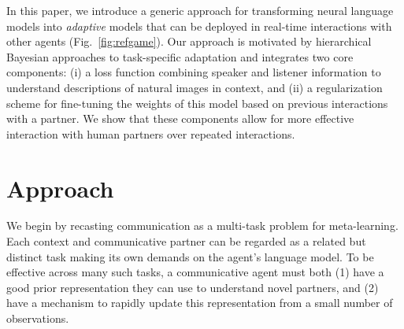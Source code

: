 In this paper, we introduce a generic approach for transforming neural language models into \emph{adaptive} models that can be deployed in real-time interactions with other agents (Fig.~\ref{fig:refgame}). 
Our approach is motivated by hierarchical Bayesian approaches to task-specific adaptation and integrates two core components: (i) a loss function combining speaker and listener information  
to understand descriptions of natural images in context, and (ii) a regularization scheme for fine-tuning the weights of this model based on previous interactions with a partner. %
We show that these components allow for more effective interaction with human partners over repeated interactions.

\section{Approach}
We begin by recasting communication as a multi-task problem for meta-learning. 
Each context and communicative partner can be regarded as a related but distinct task making its own demands on the agent's language model. 
To be effective across many such tasks, a communicative agent must both (1) have a good prior representation they can use to understand novel partners, and (2) have a mechanism to rapidly update this representation from a small number of observations.

